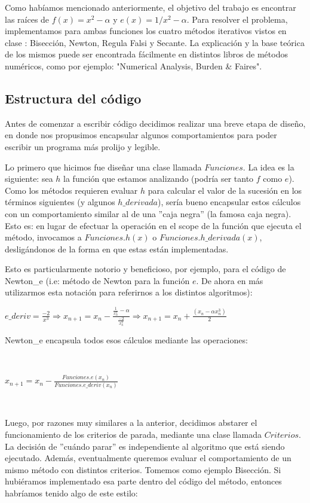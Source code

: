 Como habíamos mencionado anteriormente, el objetivo del trabajo es encontrar las raíces de $f(x)=x^{2} - \alpha$ y $e(x) = 1/x^{2} - \alpha$.
Para resolver el problema, implementamos para ambas funciones los cuatro métodos iterativos vistos en clase : Bisección, Newton, Regula Falsi y Secante.
La explicación y la base teórica de los mismos puede ser encontrada fácilmente en distintos libros de métodos numéricos, como
por ejemplo: "Numerical Analysis, Burden \& Faires". 

\subsection{Estructura del código}

Antes de comenzar a escribir código decidimos realizar una breve etapa de diseño, en donde nos propusimos encapsular algunos comportamientos para poder escribir un programa
más prolijo y legible.

Lo primero que hicimos fue diseñar una clase llamada $Funciones$. La idea es la siguiente: sea $h$ la función que estamos analizando (podría ser tanto $f$ como $e$).
Como los métodos requieren evaluar $h$ para calcular el valor de la sucesión en los términos siguientes (y algunos $h\_derivada$), sería bueno encapsular estos cálculos
con un comportamiento similar al de una ''caja negra'' (la famosa caja negra). Esto es: en lugar de efectuar la operación en el scope de la función que ejecuta el método,
invocamos a $Funciones.h(x)$ o $Funciones.h\_derivada(x)$, desligándonos de la forma en que estas están implementadas.

Esto es particularmente notorio y beneficioso, por ejemplo, para el código de Newton\_e (i.e: método de Newton para la función $e$. De ahora en más utilizarmos esta notación
para referirnos a los distintos algoritmos):

$\displaystyle e\_deriv = \frac{-2}{x^{3}} \Rightarrow x_{n+1} = x_{n} - \frac{\frac{1}{x_{n}^2}-\alpha}{\frac{-2}{x_{n}^{3}}} \Rightarrow 
x_{n+1} = x_{n} + \frac{(x_{n} - \alpha x_{n}^{3})}{2} $ 

Newton\_e encapsula todos esos cálculos mediante las operaciones:

~

$x_{n+1} = x_{n} - \frac{Funciones.e(x_{n})}{Funciones.e\_deriv(x_{n})}$

~

Luego, por razones muy similares a la anterior, decidimos abstarer el funcionamiento de los criterios de parada, mediante una clase llamada $Criterios$. La decisión de
''cuándo parar'' es independiente al algoritmo que está siendo ejecutado. Además, eventualmente queremos evaluar el comportamiento de un mismo método con distintos 
criterios. Tomemos como ejemplo Bisección. Si hubiéramos implementado esa parte dentro del código del método, entonces habríamos tenido algo de este estilo:

